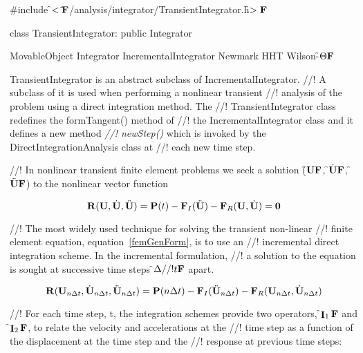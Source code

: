 
\indent \#include \f$<\tilde{ }{\bf F}$/analysis/integrator/TransientIntegrator.h\f$>{\bf F}$

\indent class TransientIntegrator: public Integrator

\indent MovableObject
\indent\indent Integrator
\indent\indent\indent IncrementalIntegrator
\indent\indent\indent{}
\indent\indent\indent\indent\indent Newmark
\indent\indent\indent\indent\indent HHT
\indent\indent\indent\indent\indent Wilson-\f$\Theta{\bf F}$

\indent TransientIntegrator is an abstract subclass of IncrementalIntegrator.
//! A subclass of it is used when performing a nonlinear transient
//! analysis of the problem using a direct integration method. The
//! TransientIntegrator class redefines the formTangent() method of
//! the IncrementalIntegrator class and it defines a new method {\em
//! newStep()} which is invoked by the DirectIntegrationAnalysis class at
//! each new time step.

//! In nonlinear transient finite element problems we seek a solution
(\f${\bf U}{\bf F}$, \f$\dot {{\bf U}}{\bf F}$, \f$\ddot {{\bf U}}{\bf F}$) to the nonlinear vector function

\begin{equation}
{\bf R}({\bf U},\dot{\bf U}, \ddot{\bf U}) = {\bf P}(t) - {\bf F}_I(\ddot{\bf U}) - {\bf F}_R({\bf U}, \dot{\bf U}) = {\bf 0}
\label{femGenForm}
\end{equation}


//! The most widely used technique for solving the transient non-linear 
//! finite element equation, equation~\ref{femGenForm}, is to use an
//! incremental direct integration scheme. In the incremental formulation,
//! a solution to the equation is sought at successive time steps \f$\Delta
//! t{\bf F}$ apart.  

\begin{equation}
{\bf R}({\bf U}_{n \Delta t},\dot{\bf U}_{n \Delta t}, \ddot{\bf U}_{n \Delta t}) = {\bf P}(n \Delta t) -
{\bf F}_I(\ddot{\bf U}_{n \Delta t}) - {\bf F}_R({\bf U}_{n \Delta t}, \dot{\bf U}_{n \Delta t})
\label{fullTimeForm}
\end{equation}

//! For each time step, t, the integration schemes provide two operators,
\f$\mathop{\cal {\bf I}}_1{\bf F}$ and \f$\mathop{\cal {\bf I}}_2{\bf F}$, to relate the velocity and accelerations at the 
//! time step as a function of the displacement at the time step and the
//! response at previous time steps: 

